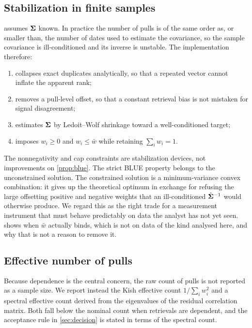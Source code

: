 \documentclass[12pt,a4paper,oneside]{article}
\begin{document}
\subsection{Stabilization in finite samples}

 assumes $\bm{\Sigma}$ known. In practice the number of pulls is of the
same order as, or smaller than, the number of dates used to estimate the
covariance, so the sample covariance is ill-conditioned and its inverse is
unstable. The implementation therefore:

\begin{enumerate}
\item collapses exact duplicates analytically, so that a repeated vector cannot
inflate the apparent rank;
\item removes a pull-level offset, so that a constant retrieval bias is not
mistaken for signal disagreement;
\item estimates $\bm{\Sigma}$ by Ledoit--Wolf shrinkage \citep{LedoitWolf2004} toward a
well-conditioned target;
\item imposes $w_i \ge 0$ and $w_i \le \bar{w}$ while retaining
$\sum_i w_i = 1$.
\end{enumerate}

\begin{remark}
The nonnegativity and cap constraints are stabilization devices, not
improvements on \cref{prop:blue}. The strict BLUE property belongs to the
unconstrained solution. The constrained solution is a minimum-variance convex
combination: it gives up the theoretical optimum in exchange for refusing the
large offsetting positive and negative weights that an ill-conditioned
$\hat{\bm{\Sigma}}^{-1}$ would otherwise produce. We regard this as the right trade for
a measurement instrument that must behave predictably on data the analyst has
not yet seen.  shows when $\bar{w}$ actually binds, which is
not on data of the kind analysed here, and why that is not a reason to remove it.
\end{remark}

\subsection{Effective number of pulls}

Because dependence is the central concern, the raw count of pulls is not
reported as a sample size. We report instead the Kish effective count
\citep{Kish1965} $1/\sum_i w_i^2$ and a spectral effective count derived from the
eigenvalues of the residual correlation matrix. Both fall below the nominal
count when retrievals are dependent, and the acceptance rule in
\cref{sec:decision} is stated in terms of the spectral count.
\end{document}
